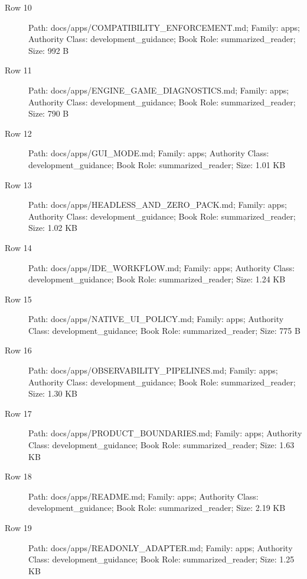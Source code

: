 \documentclass[9pt,a4paper]{book}
\begin{document}
\begin{description}
\item[Row 10] Path: docs/\allowbreak{}apps/\allowbreak{}COMPATIBILITY\_\allowbreak{}ENFORCEMENT.\allowbreak{}md; Family: apps; Authority Class: development\_\allowbreak{}guidance; Book Role: summarized\_\allowbreak{}reader; Size: 992 B
\item[Row 11] Path: docs/\allowbreak{}apps/\allowbreak{}ENGINE\_\allowbreak{}GAME\_\allowbreak{}DIAGNOSTICS.\allowbreak{}md; Family: apps; Authority Class: development\_\allowbreak{}guidance; Book Role: summarized\_\allowbreak{}reader; Size: 790 B
\item[Row 12] Path: docs/\allowbreak{}apps/\allowbreak{}GUI\_\allowbreak{}MODE.\allowbreak{}md; Family: apps; Authority Class: development\_\allowbreak{}guidance; Book Role: summarized\_\allowbreak{}reader; Size: 1.\allowbreak{}01 KB
\item[Row 13] Path: docs/\allowbreak{}apps/\allowbreak{}HEADLESS\_\allowbreak{}AND\_\allowbreak{}ZERO\_\allowbreak{}PACK.\allowbreak{}md; Family: apps; Authority Class: development\_\allowbreak{}guidance; Book Role: summarized\_\allowbreak{}reader; Size: 1.\allowbreak{}02 KB
\item[Row 14] Path: docs/\allowbreak{}apps/\allowbreak{}IDE\_\allowbreak{}WORKFLOW.\allowbreak{}md; Family: apps; Authority Class: development\_\allowbreak{}guidance; Book Role: summarized\_\allowbreak{}reader; Size: 1.\allowbreak{}24 KB
\item[Row 15] Path: docs/\allowbreak{}apps/\allowbreak{}NATIVE\_\allowbreak{}UI\_\allowbreak{}POLICY.\allowbreak{}md; Family: apps; Authority Class: development\_\allowbreak{}guidance; Book Role: summarized\_\allowbreak{}reader; Size: 775 B
\item[Row 16] Path: docs/\allowbreak{}apps/\allowbreak{}OBSERVABILITY\_\allowbreak{}PIPELINES.\allowbreak{}md; Family: apps; Authority Class: development\_\allowbreak{}guidance; Book Role: summarized\_\allowbreak{}reader; Size: 1.\allowbreak{}30 KB
\item[Row 17] Path: docs/\allowbreak{}apps/\allowbreak{}PRODUCT\_\allowbreak{}BOUNDARIES.\allowbreak{}md; Family: apps; Authority Class: development\_\allowbreak{}guidance; Book Role: summarized\_\allowbreak{}reader; Size: 1.\allowbreak{}63 KB
\item[Row 18] Path: docs/\allowbreak{}apps/\allowbreak{}README.\allowbreak{}md; Family: apps; Authority Class: development\_\allowbreak{}guidance; Book Role: summarized\_\allowbreak{}reader; Size: 2.\allowbreak{}19 KB
\item[Row 19] Path: docs/\allowbreak{}apps/\allowbreak{}READONLY\_\allowbreak{}ADAPTER.\allowbreak{}md; Family: apps; Authority Class: development\_\allowbreak{}guidance; Book Role: summarized\_\allowbreak{}reader; Size: 1.\allowbreak{}25 KB

\end{description}
\end{document}
